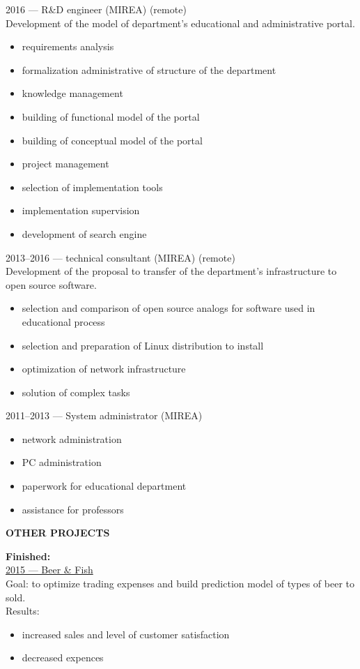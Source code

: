 \documentclass[a4paper,12pt,fullpage]{article}
\begin{document}
2016 --- R\&D engineer (MIREA) (remote)\\
Development of the model of department's educational and administrative portal.
\begin{itemize}
	\item requirements analysis
	\item formalization administrative of structure of the department
	\item knowledge management
	\item building of functional model of the portal
	\item building of conceptual model of the portal
	\item project management
	\item selection of implementation tools
	\item implementation supervision
	\item development of search engine
\end{itemize}

2013--2016 --- technical consultant (MIREA) (remote)\\
Development of the proposal to transfer of the department's infrastructure to open source software.
\begin{itemize}
	\item selection and comparison of open source analogs for software used in educational process
	\item selection and preparation of Linux distribution to install
	\item optimization of network infrastructure
	\item solution of complex tasks\\
\end{itemize}

2011--2013 --- System administrator (MIREA)
\begin{itemize}
	\item network administration
	\item PC administration
	\item paperwork for educational department
	\item assistance for professors
\end{itemize}

\begin{center}
	\textbf{OTHER PROJECTS}
\end{center}

\textbf{Finished:}\\
\underline{2015 --- Beer \& Fish}\\
Goal: to optimize trading expenses and build prediction model of types of beer to sold.\\
Results:
\begin{itemize}
	\item increased sales and level of customer satisfaction
	\item decreased expences\\
\end{itemize}
\end{document}
